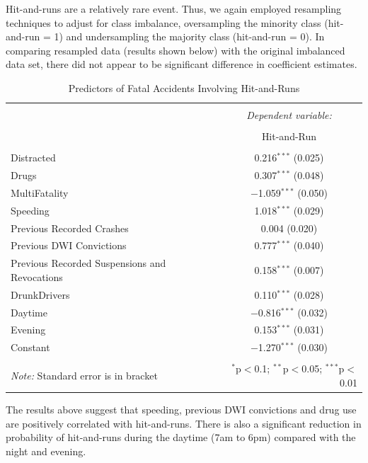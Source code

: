\documentclass[11pt, oneside,titlepage]{article}   	%
\begin{document}
Hit-and-runs are a relatively rare event. Thus, we again employed resampling techniques to adjust for class imbalance, oversampling the minority class (hit-and-run = 1) and undersampling the majority class (hit-and-run = 0). In comparing resampled data (results shown below) with the original imbalanced data set, there did not appear to be significant difference in coefficient estimates.

\begin{table}[!htbp] \centering 
	\label{} 
	\begin{tabular}{@{\extracolsep{5pt}}lc} 
		\\[-1.8ex]\hline 
		\hline \\[-1.8ex] 
		& \multicolumn{1}{c}{\textit{Dependent variable:}} \\ 
		\cline{2-2} 
		\\[-1.8ex] & Hit-and-Run \\ 
		\hline \\[-1.8ex] 
		Distracted & 0.216$^{***}$ (0.025) \\ 
		Drugs & 0.307$^{***}$ (0.048) \\ 
		MultiFatality & $-$1.059$^{***}$ (0.050) \\ 
		Speeding & 1.018$^{***}$ (0.029) \\ 
		Previous Recorded Crashes & 0.004 (0.020) \\ 
		Previous DWI Convictions & 0.777$^{***}$ (0.040) \\ 
		Previous Recorded Suspensions and Revocations & 0.158$^{***}$ (0.007) \\ 
		DrunkDrivers & 0.110$^{***}$ (0.028) \\ 
		Daytime & $-$0.816$^{***}$ (0.032) \\ 
		Evening & 0.153$^{***}$ (0.031) \\ 
		Constant & $-$1.270$^{***}$ (0.030) \\  
		\hline \\[-1.8ex] 
		\textit{Note:} Standard error is in bracket & \multicolumn{1}{r}{$^{*}$p$<$0.1; $^{**}$p$<$0.05; $^{***}$p$<$0.01} \\ 
	\end{tabular} 
	\caption{Predictors of Fatal Accidents Involving Hit-and-Runs}
\end{table} 

The results above suggest that speeding, previous DWI convictions and drug use are positively correlated with hit-and-runs. There is also a significant reduction in probability of hit-and-runs during the daytime (7am to 6pm) compared with the night and evening.
\end{document}
